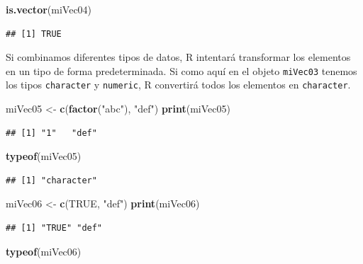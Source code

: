 \documentclass[
]{book}
\newenvironment{Shaded}{\begin{snugshade}}{\end{snugshade}}
\newcommand{\KeywordTok}[1]{\textcolor[rgb]{0.13,0.29,0.53}{\textbf{#1}}}
\newcommand{\NormalTok}[1]{#1}
\newcommand{\OtherTok}[1]{\textcolor[rgb]{0.56,0.35,0.01}{#1}}
\newcommand{\StringTok}[1]{\textcolor[rgb]{0.31,0.60,0.02}{#1}}
\begin{document}
\begin{Shaded}
\begin{Highlighting}[]
\KeywordTok{is.vector}\NormalTok{(miVec04)}
\end{Highlighting}
\end{Shaded}

\begin{verbatim}
## [1] TRUE
\end{verbatim}

Si combinamos diferentes tipos de datos, R intentará transformar los elementos en un tipo de forma predeterminada. Si como aquí en el objeto \texttt{miVec03} tenemos los tipos \texttt{character} y \texttt{numeric}, R convertirá todos los elementos en \texttt{character}.

\begin{Shaded}
\begin{Highlighting}[]
\NormalTok{miVec05 <-}\StringTok{ }\KeywordTok{c}\NormalTok{(}\KeywordTok{factor}\NormalTok{(}\StringTok{"abc"}\NormalTok{), }\StringTok{"def"}\NormalTok{)}
\KeywordTok{print}\NormalTok{(miVec05)}
\end{Highlighting}
\end{Shaded}

\begin{verbatim}
## [1] "1"   "def"
\end{verbatim}

\begin{Shaded}
\begin{Highlighting}[]
\KeywordTok{typeof}\NormalTok{(miVec05)}
\end{Highlighting}
\end{Shaded}

\begin{verbatim}
## [1] "character"
\end{verbatim}

\begin{Shaded}
\begin{Highlighting}[]
\NormalTok{miVec06 <-}\StringTok{ }\KeywordTok{c}\NormalTok{(}\OtherTok{TRUE}\NormalTok{, }\StringTok{"def"}\NormalTok{)}
\KeywordTok{print}\NormalTok{(miVec06)}
\end{Highlighting}
\end{Shaded}

\begin{verbatim}
## [1] "TRUE" "def"
\end{verbatim}

\begin{Shaded}
\begin{Highlighting}[]
\KeywordTok{typeof}\NormalTok{(miVec06)}
\end{Highlighting}
\end{Shaded}
\end{document}
